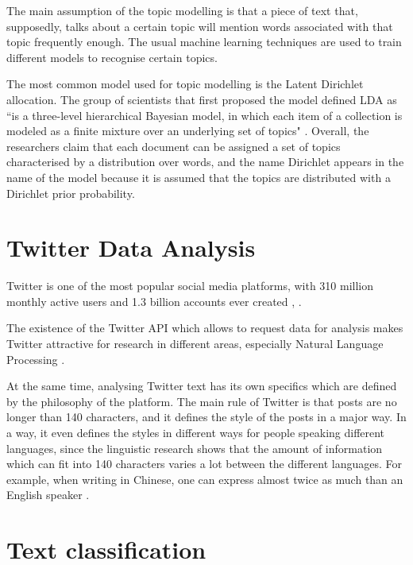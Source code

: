 The main assumption of the topic modelling is that a piece of text that, supposedly, talks about a certain topic will mention words associated with that topic frequently enough. The usual machine learning techniques are used to train different models to recognise certain topics. 

The most common model used for topic modelling is the Latent Dirichlet allocation. The group of scientists that first proposed the model defined LDA as ``is a three-level hierarchical Bayesian model, in which each
item of a collection is modeled as a finite mixture over an underlying set of topics" \cite{blei2003latent}. Overall, the researchers claim that each document can be assigned a set of topics characterised by a distribution over words, and the name Dirichlet appears in the name of the model because it is assumed that the topics are distributed with a Dirichlet prior probability. 

\section{Twitter Data Analysis}
\label{sec:twitter_analysis}

Twitter is one of the most popular social media platforms, with 310 million monthly active users and 1.3 billion accounts ever created \cite{twittertcstats}, \cite{twitterbistats}. 

The existence of the Twitter API which allows to request data for analysis makes Twitter attractive for research in different areas, especially Natural Language Processing \cite{twitterapi}. 

At the same time, analysing Twitter text has its own specifics which are defined by the philosophy of the platform. The main rule of Twitter is that posts are no longer than 140 characters, and it defines the style of the posts in a major way. In a way, it even defines the styles in different ways for people speaking different languages, since the linguistic research shows that the amount of information which can fit into 140 characters varies a lot between the different languages. For example, when writing in Chinese, one can express almost twice as much than an English speaker \cite{neubig2013much}. 



\section{Text classification}
\label{sec:text_classification}


